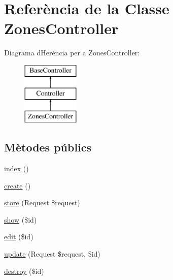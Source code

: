 \hypertarget{class_app_1_1_http_1_1_controllers_1_1_zones_controller}{}\section{Referència de la Classe Zones\+Controller}
\label{class_app_1_1_http_1_1_controllers_1_1_zones_controller}
Diagrama d\textquotesingle{}Herència per a Zones\+Controller\+:\begin{figure}[H]
\begin{center}
\leavevmode
\includegraphics[height=3.000000cm]{class_app_1_1_http_1_1_controllers_1_1_zones_controller}
\end{center}
\end{figure}
\subsection*{Mètodes públics}
\begin{DoxyCompactItemize}
\item 
\mbox{\hyperlink{class_app_1_1_http_1_1_controllers_1_1_zones_controller_a149eb92716c1084a935e04a8d95f7347}{index}} ()
\item 
\mbox{\hyperlink{class_app_1_1_http_1_1_controllers_1_1_zones_controller_a435e7d7525d4bcd0ed5e34a469f3adf6}{create}} ()
\item 
\mbox{\hyperlink{class_app_1_1_http_1_1_controllers_1_1_zones_controller_a9ef485163104597c12185b53cdacf638}{store}} (Request \$request)
\item 
\mbox{\hyperlink{class_app_1_1_http_1_1_controllers_1_1_zones_controller_ae4914d07a9bbe4aede7a5dea759f6287}{show}} (\$id)
\item 
\mbox{\hyperlink{class_app_1_1_http_1_1_controllers_1_1_zones_controller_a459ed16587e3a50b39b672c7e473abc5}{edit}} (\$id)
\item 
\mbox{\hyperlink{class_app_1_1_http_1_1_controllers_1_1_zones_controller_affb03cc19897a1800a0f411264d6c7cc}{update}} (Request \$request, \$id)
\item 
\mbox{\hyperlink{class_app_1_1_http_1_1_controllers_1_1_zones_controller_a726fa8a4b4b187b9ca32ba427aac8137}{destroy}} (\$id)
\end{DoxyCompactItemize}


